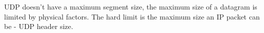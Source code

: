 UDP doesn't have a maximum segment size, the maximum size of a datagram is limited by physical factors. The hard limit is the maximum size an IP packet can be - UDP header size.